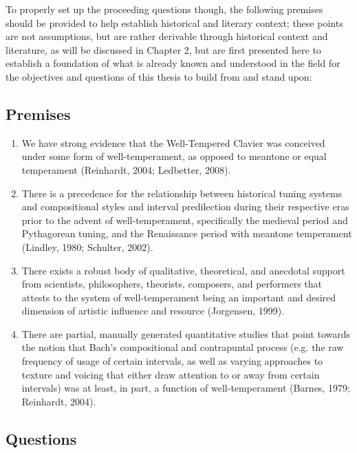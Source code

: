 To properly set up the proceeding questions though, the following
premises should be provided to help establish historical and literary
context; these points are not assumptions, but are rather derivable
through historical context and literature, as will be discussed in
Chapter 2, but are first presented here to establish a foundation of
what is already known and understood in the field for the objectives and
questions of this thesis to build from and stand upon:

\subsection{Premises}\label{premises}

\begin{enumerate}
\def\labelenumi{\arabic{enumi}.}
\tightlist
\item
  We have strong evidence that the Well-Tempered Clavier was conceived
  under some form of well-temperament, as opposed to meantone or equal
  temperament (Reinhardt, 2004; Ledbetter, 2008).
\item
  There is a precedence for the relationship between historical tuning
  systems and compositional styles and interval predilection during
  their respective eras prior to the advent of well-temperament,
  specifically the medieval period and Pythagorean tuning, and the
  Renaissance period with meantone temperament (Lindley, 1980; Schulter,
  2002).
\item
  There exists a robust body of qualitative, theoretical, and anecdotal
  support from scientists, philosophers, theorists, composers, and
  performers that attests to the system of well-temperament being an
  important and desired dimension of artistic influence and resource
  (Jorgensen, 1999).
\item
  There are partial, manually generated quantitative studies that point
  towards the notion that Bach's compositional and contrapuntal process
  (e.g. the raw frequency of usage of certain intervals, as well as
  varying approaches to texture and voicing that either draw attention
  to or away from certain intervals) was at least, in part, a function
  of well-temperament (Barnes, 1979; Reinhardt, 2004).
\end{enumerate}

\subsection{Questions}\label{questions}

